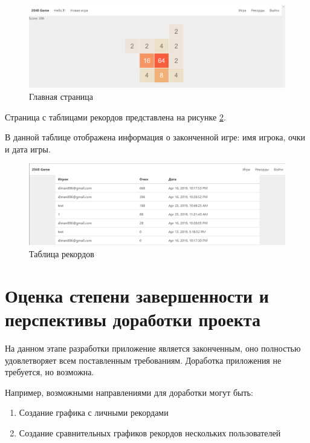 \documentclass[hidelinks]{article}
\begin{document}
\begin{figure}[H]
    \centering
    \includegraphics[scale=0.5]{img/game.png}
    \caption{Главная страница}
    \label{fig:main}
\end{figure}

Страница с таблицами рекордов представлена на рисунке \ref{fig:leaderboards}.

В данной таблице отображена информация о законченной игре: имя игрока, очки и дата игры.

\begin{figure}[H]
    \centering
    \includegraphics[scale=0.5]{img/leaderboards.png}
    \caption{Таблица рекордов}
    \label{fig:leaderboards}
\end{figure}


\section{Оценка степени завершенности и перспективы доработки проекта}
На данном этапе разработки приложение является законченным, оно полностью удовлетворяет всем поставленным требованиям. Доработка приложения не требуется, но возможна.

Например, возможными направлениями для доработки могут быть:
\begin{enumerate}
    \item Создание графика с личными рекордами
    \item Создание сравнительных графиков рекордов нескольких пользователей
\end{enumerate}
\end{document}
